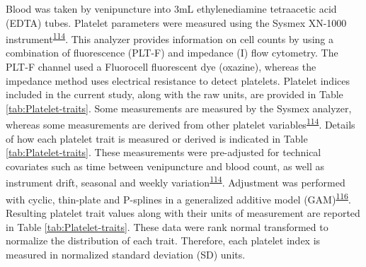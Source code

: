 \documentclass[11pt,twoside]{bristolthesis}
\begin{document}
Blood was taken by venipuncture into 3mL ethylenediamine tetraacetic acid (EDTA) tubes. Platelet parameters were measured using the Sysmex XN-1000 instrument\textsuperscript{\protect\hyperlink{ref-Astle2016}{114}}. This analyzer provides information on cell counts by using a combination of fluorescence (PLT-F) and impedance (I) flow cytometry. The PLT-F channel used a Fluorocell fluorescent dye (oxazine), whereas the impedance method uses electrical resistance to detect platelets. Platelet indices included in the current study, along with the raw units, are provided in Table \ref{tab:Platelet-traits}. Some measurements are measured by the Sysmex analyzer, whereas some measurements are derived from other platelet variables\textsuperscript{\protect\hyperlink{ref-Astle2016}{114}}. Details of how each platelet trait is measured or derived is indicated in Table \ref{tab:Platelet-traits}. These measurements were pre-adjusted for technical covariates such as time between venipuncture and blood count, as well as instrument drift, seasonal and weekly variation\textsuperscript{\protect\hyperlink{ref-Astle2016}{114}}. Adjustment was performed with cyclic, thin-plate and P-splines in a generalized additive model (GAM)\textsuperscript{\protect\hyperlink{ref-Akbari2020}{116}}. Resulting platelet trait values along with their units of measurement are reported in Table \ref{tab:Platelet-traits}. These data were rank normal transformed to normalize the distribution of each trait. Therefore, each platelet index is measured in normalized standard deviation (SD) units.
\end{document}
